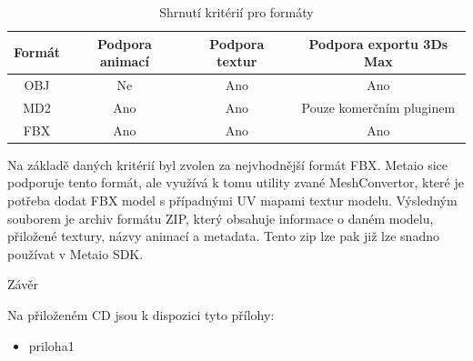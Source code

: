 \documentclass[twoside,12pt]{article}
\begin{document}
\begin{table}[H]
\centering
\begin{tabular}{|c|c|c|c|}
\hline
Formát & Podpora animací & Podpora textur & Podpora exportu 3Ds Max  \\ \hline
OBJ    & Ne              & Ano            & Ano                      \\ \hline
MD2    & Ano             & Ano            & Pouze komerčním pluginem \\ \hline
FBX    & Ano             & Ano            & Ano                      \\ \hline
\end{tabular}
\caption{Shrnutí kritérií pro formáty}
\end{table}


Na základě daných kritérií byl zvolen za nejvhodnější formát FBX. Metaio sice podporuje tento formát, ale využívá k tomu utility zvané MeshConvertor, které je potřeba dodat FBX model s případnými UV mapami textur modelu. Výsledným souborem je archiv formátu ZIP, který obsahuje informace o daném modelu, přiložené textury, názvy animací a metadata. Tento zip lze pak již lze snadno používat v Metaio SDK.


% 
\newpage


% 
\newpage

%
%
Závěr

%

%
%
Na přiloženém CD jsou k dispozici tyto přílohy: 
\begin{itemize}
\item priloha1
\end{itemize}
\end{document}
